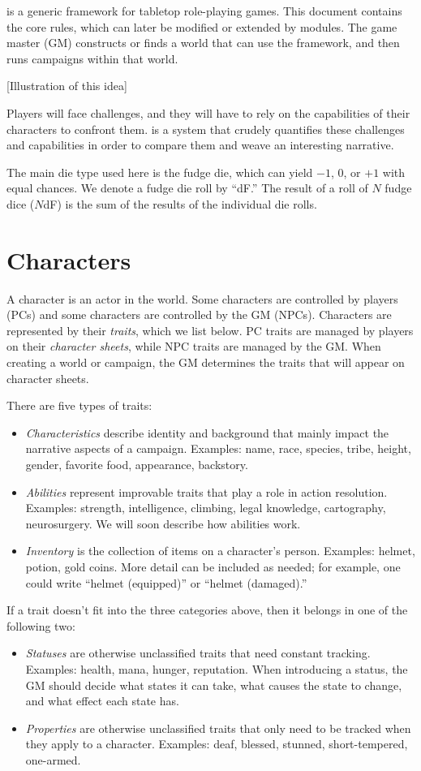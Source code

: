 \peupfudge{} is a generic framework for tabletop role-playing games.
This document contains the core rules, which can later be modified or extended by modules.
The game master (GM) constructs or finds a world that can use the \peupfudge{} framework,
and then runs campaigns within that world. 

[Illustration of this idea]

Players will face challenges, and they will have to rely on the capabilities of their characters to confront them.
\peupfudge{} is a system that crudely quantifies these challenges and capabilities in order to compare them and weave an interesting narrative.

The main die type used here is the fudge die, which can yield $-1$, $0$, or $+1$ with equal chances.
We denote a fudge die roll by ``dF.'' The result of a roll of $N$ fudge dice ($N$dF) is the sum of the results of the individual die rolls.

\section{Characters}
A character is an actor in the world.
Some characters are controlled by players (PCs) and some characters are controlled by the GM (NPCs).
Characters are represented by their \emph{traits}, which we list below.
PC traits are managed by players on their \emph{character sheets}, while NPC traits are managed by the GM.
When creating a world or campaign, the GM determines the traits that will appear on character sheets.

There are five types of traits:
\begin{itemize}
\item
\emph{Characteristics} describe identity and background that mainly impact the narrative aspects of a campaign.
Examples: name, race, species, tribe, height, gender, favorite food, appearance, backstory.
\item
\emph{Abilities} represent improvable traits that play a role in action resolution.
Examples: strength, intelligence, climbing, legal knowledge, cartography, neurosurgery.
We will soon describe how abilities work.
\item
\emph{Inventory} is the collection of items on a character’s person.
Examples: helmet, potion, gold coins.
More detail can be included as needed; for example, one could write ``helmet (equipped)'' or ``helmet (damaged).''
\end{itemize}
If a trait doesn’t fit into the three categories above, then it belongs in one of the following two:
\begin{itemize}
\item
\emph{Statuses} are otherwise unclassified traits that need constant tracking.
Examples: health, mana, hunger, reputation.
When introducing a status, the GM should decide what states it can take, what causes the state to change, and what effect each state has.
\item
\emph{Properties} are otherwise unclassified traits that only need to be tracked when they apply to a character.
Examples: deaf, blessed, stunned, short-tempered, one-armed.
\end{itemize}

